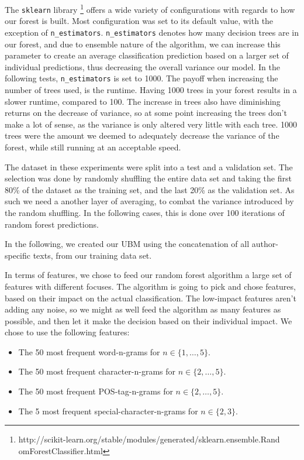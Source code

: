 The \texttt{sklearn} library
\footnote{http://scikit-learn.org/stable/modules/generated/sklearn.ensemble.Rand
omForestClassifier.html} offers a wide variety of configurations with regards to
how our forest is built. Most configuration was set to its default value, with
the exception of \texttt{n\_estimators}. \texttt{n\_estimators} denotes how many
decision trees are in our forest, and due to ensemble nature of the algorithm,
we can increase this parameter to create an average classification prediction
based on a larger set of individual predictions, thus decreasing the overall
variance our model. In the following tests, \texttt{n\_estimators} is set to
1000. The payoff when increasing the number of trees used, is the runtime.
Having 1000 trees in your forest results in a slower runtime, compared to 100.
The increase in trees also have diminishing returns on the decrease of variance,
so at some point increasing the trees don't make a lot of sense, as the
variance is only altered very little with each tree. 1000 trees were the amount
we deemed to adequately decrease the variance of the forest, while still running
at an acceptable speed.

The dataset in these experiments were split into a test and a validation set.
The selection was done by randomly shuffling the entire data set and taking
the first 80\% of the dataset as the training set, and the last 20\% as the
validation set. As such we need a another layer of averaging, to combat the
variance introduced by the random shuffling. In the following cases, this is
done over 100 iterations of random forest predictions.

In the following, we created our \gls{UBM} using the concatenation of all
author-specific texts, from our training data set.

In terms of features, we chose to feed our random forest algorithm a large set
of features with different focuses. The algorithm is going to pick and chose
features, based on their impact on the actual classification. The low-impact
features aren't adding any noise, so we might as well feed the algorithm as
many features as possible, and then let it make the decision based on their
individual impact. We chose to use the following features:

\begin{itemize}
    \item The 50 most frequent word-n-grams for $n \in \{1, \dots, 5\}$.
    \item The 50 most frequent character-n-grams for $n \in \{2, \dots, 5\}$.
    \item The 50 most frequent \gls{POS}-tag-n-grams for $n \in \{2, \dots, 5\}$.
    \item The 5 most frequent special-character-n-grams for $n \in \{2, 3\}$.
\end{itemize}

